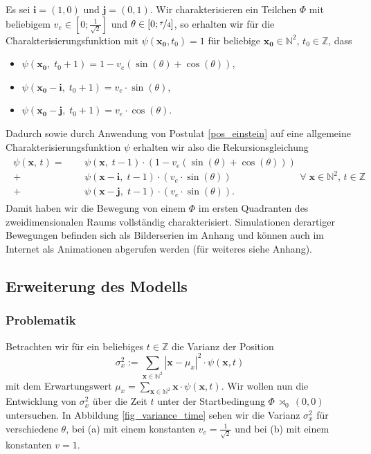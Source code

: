 \documentclass[a4paper,12pt,ngerman]{scrartcl}
\theoremstyle{plain}
\theoremstyle{plain}
\theoremstyle{plain}
\theoremstyle{plain}
\newcommand{\Z}{\mathbb{Z}}
\newcommand{\N}{\mathbb{N}}
\newcommand{\at}[1]{\;\rtimes_{#1}\;}
\begin{document}
Es sei $\pmb{i}=(1,0)$ und $\pmb{j}=(0,1)$. Wir charakterisieren ein Teilchen $\Phi$ mit beliebigem $v_e\in[0;\frac{1}{\sqrt{2}}]$ und $\theta\in[0;\nicefrac{\tau}{4}]$, so erhalten wir für die Charakterisierungsfunktion mit $\psi(\pmb{x_0},t_0)=1$ für beliebige $\pmb{x_0}\in\N^2$, $t_0\in\Z$, dass 

{
\begin{itemize}
\item $\psi(\pmb{x_0},\;t_0+1)=1-v_e(\sin(\theta)+\cos(\theta))$,
\item $\psi(\pmb{x_0}-\pmb{i},\;t_0+1)=v_e\cdot\sin(\theta)$,
\item $\psi(\pmb{x_0}-\pmb{j},\;t_0+1)=v_e\cdot\cos(\theta)$.
\end{itemize}
}
Dadurch sowie durch Anwendung von Postulat \ref{pos_einstein} auf eine allgemeine Charakterisierungsfunktion $\psi$ erhalten wir also die Rekursionsgleichung
\begin{align*}
\begin{split}
\psi(\pmb{x},\,t)=\phantom{+}&\psi(\pmb{x},\;t-1)\cdot(1-v_e(\sin(\theta)+\cos(\theta)))\\
+\,&\psi(\pmb{x}-\pmb{i},\;t-1)\cdot(v_e\cdot\sin(\theta))\\
+\,&\psi(\pmb{x}-\pmb{j},\;t-1)\cdot(v_e\cdot\sin(\theta)).
\end{split} \forall\;\pmb{x}\in\N^2,\,t\in\Z
\end{align*}
Damit haben wir die Bewegung von einem $\Phi$ im ersten Quadranten des zweidimensionalen Raums vollständig charakterisiert. Simulationen derartiger Bewegungen befinden sich als Bilderserien im Anhang und können auch im Internet als Animationen abgerufen werden (für weiteres siehe Anhang).

\subsection{Erweiterung des Modells}

\subsubsection{Problematik}

Betrachten wir für ein beliebiges $t\in\Z$ die Varianz der Position
\[\sigma_x^2:=\sum_{\pmb{x}\in\N^2}|\pmb{x}-\mu_x|^2\cdot\psi(\pmb{x},t)\]
mit dem Erwartungswert $\mu_x=\sum_{\pmb{x}\in\N^2}\pmb{x}\cdot\psi(\pmb{x},t)$. Wir wollen nun die Entwicklung von $\sigma_x^2$ über die Zeit $t$ unter der Startbedingung $\Phi\at{0}(0,0)$ untersuchen. In Abbildung \ref{fig_variance_time} sehen wir die Varianz $\sigma_x^2$ für verschiedene $\theta$, bei (a) mit einem konstanten $v_e=\frac{1}{\sqrt{2}}$ und bei (b) mit einem konstanten $v=1$.
\end{document}
